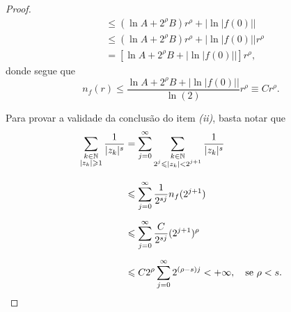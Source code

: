 \begin{proof}
\begin{align*}
                        &\leq (\ln A + 2^{\rho}B)r^{\rho} + \big|\ln|f(0)|\big| 
                        \\[0.2cm]
                        &\leq (\ln A + 2^{\rho}B)r^{\rho} + \big|\ln|f(0)|\big|r^{\rho} 
                        \\[0.2cm]
                        &= [\ln A + 2^{\rho}B + \big|\ln|f(0)|\big|]r^{\rho},
       \end{align*}
       donde segue que
       \begin{equation*}
           n_f(r) \leq \frac{\ln A + 2^{\rho}B + \big|\ln|f(0)|\big|}{\ln(2)}r^{\rho} 
           \equiv Cr^{\rho}.
       \end{equation*}
       
       \medskip 
       Para provar a validade da conclusão do item {\it (ii)}, basta notar que
       \begin{align*}
           \sum_{\substack{k\in\mathbb{N} \\ |z_k|\geqslant 1}} \frac{1}{|z_k|^s}
           &= \sum_{j=0}^{\infty} 
           \sum_{\substack{k\in\mathbb{N} \\ 2^j \leqslant |z_k| < 2^{j+1}}} \frac{1}{|z_k|^s} 
           \\[0.3cm]
           &\leqslant \sum_{j=0}^{\infty} \frac{1}{2^{sj}}n_f(2^{j+1})
           \\[0.2cm]
           &\leqslant \sum_{j=0}^{\infty} \frac{C}{2^{sj}}(2^{j+1})^{\rho} 
           \\[0.2cm]
           &\leqslant C2^{\rho} \sum_{j=0}^{\infty} 2^{(\rho - s)j}< +\infty,\quad 
           \text{se}\ \rho < s.
       \end{align*}
    \end{proof}
    
